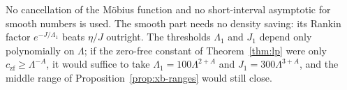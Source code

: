 \begin{remark}
No cancellation of the M\"obius function and no short-interval asymptotic for smooth numbers is used. The smooth part
needs no density saving: its Rankin factor $e^{-J/\Lambda_1}$ beats $\eta/J$ outright. The thresholds $\Lambda_1$ and $J_1$
depend only polynomially on $\Lambda$; if the zero-free constant of Theorem~\ref{thm:lp} were only $c_{\mathrm{zf}}\ge\Lambda^{-A}$,
it would suffice to take $\Lambda_1=100\Lambda^{2+A}$ and $J_1=300\Lambda^{3+A}$, and the middle range of
Proposition~\ref{prop:xb-ranges} would still close.
\end{remark}
